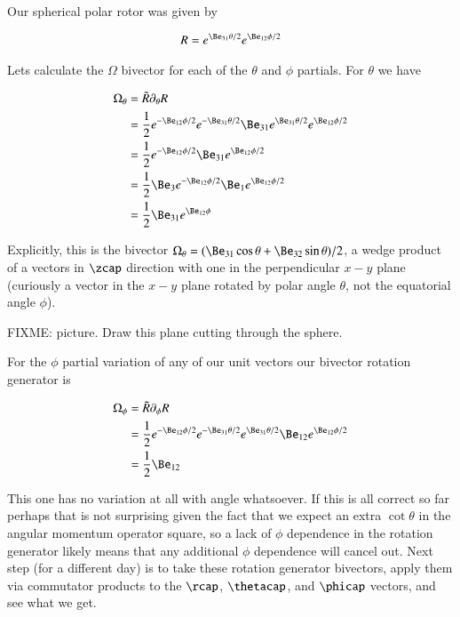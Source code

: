 Our spherical polar rotor was given by

\begin{align}\label{eqn:qmAngularMom:goo4}
R = e^{\Be_{31}\theta/2} e^{\Be_{12}\phi/2}
\end{align}

Lets calculate the $\Omega$ bivector for each of the $\theta$ and $\phi$ partials.  For $\theta$ we have

\begin{align*}
\Omega_\theta &= \tilde{R} \partial_\theta R \\
&= \frac{1}{2} e^{-\Be_{12}\phi/2} e^{-\Be_{31}\theta/2} \Be_{31} e^{\Be_{31}\theta/2} e^{\Be_{12}\phi/2} \\
&= \frac{1}{2} e^{-\Be_{12}\phi/2} \Be_{31} e^{\Be_{12}\phi/2} \\
&= \frac{1}{2} \Be_3 e^{-\Be_{12}\phi/2} \Be_{1} e^{\Be_{12}\phi/2} \\
&= \frac{1}{2} \Be_{31} e^{\Be_{12}\phi} \\
\end{align*}

Explicitly, this is the bivector $\Omega_\theta = (\Be_{31} \cos\theta + \Be_{32} \sin\theta)/2$, a wedge product of a vectors in $\zcap$ direction with one in the perpendicular $x-y$ plane (curiously a vector in the $x-y$ plane rotated by polar angle $\theta$, not the equatorial angle $\phi$).

FIXME: picture.  Draw this plane cutting through the sphere.

For the $\phi$ partial variation of any of our unit vectors our bivector rotation generator is

\begin{align*}
\Omega_\phi &= \tilde{R} \partial_\phi R \\
&= \frac{1}{2} e^{-\Be_{12}\phi/2} e^{-\Be_{31}\theta/2} e^{\Be_{31}\theta/2} \Be_{12} e^{\Be_{12}\phi/2} \\
&= \frac{1}{2} \Be_{12} \\
\end{align*}

This one has no variation at all with angle whatsoever.  If this is all correct so far perhaps that is not surprising given the fact that we expect an extra $\cot\theta$ in the angular momentum operator square, so a lack of $\phi$ dependence in the rotation generator likely means that any additional $\phi$ dependence will cancel out.  Next step (for a different day) is to take these rotation generator bivectors, apply them via commutator products to the $\rcap$, $\thetacap$, and $\phicap$ vectors, and see what we get.

\EndArticle
